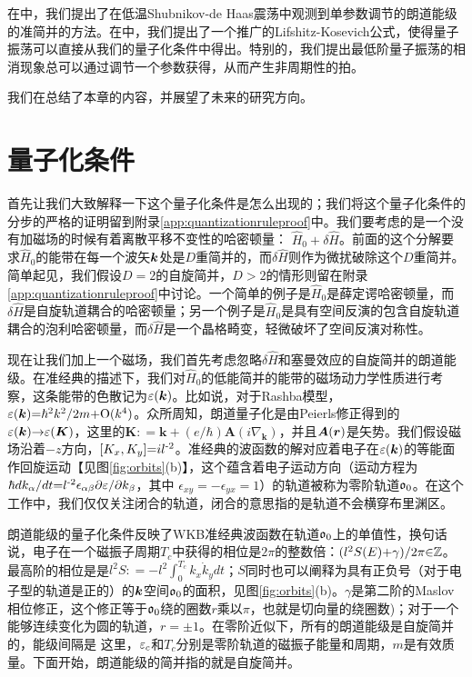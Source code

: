 在中，我们提出了在低温Shubnikov-de Haas震荡\cite{SdH}中观测到单参数调节的朗道能级的准简并的方法。在中，我们提出了一个推广的Lifshitz-Kosevich公式，使得量子振荡可以直接从我们的量子化条件中得出。特别的，我们提出最低阶量子振荡的相消现象总可以通过调节一个参数获得，从而产生非周期性的拍。

我们在总结了本章的内容，并展望了未来的研究方向。


\section{量子化条件\label{sec:qtznrules}}

首先让我们大致解释一下这个量子化条件是怎么出现的；我们将这个量子化条件的分步的严格的证明留到附录\ref{app:quantizationruleproof}中。我们要考虑的是一个没有加磁场的时候有着离散平移不变性的哈密顿量： $\hat{H}_0{+}\delta \hat{H}$。前面的这个分解要求$\hat{H}_0$的能带在每一个波矢$\boldsymbol{k}$处是$D$重简并的，而$\delta \hat{H}$则作为微扰破除这个$D$重简并。简单起见，我们假设$D{=}2$的自旋简并，$D>2$的情形则留在附录\ref{app:quantizationruleproof}中讨论。一个简单的例子是$\hat{H}_0$是薛定谔哈密顿量，而$\delta \hat{H}$是自旋轨道耦合的哈密顿量；另一个例子是$\hat{H}_0$是具有空间反演的包含自旋轨道耦合的泡利哈密顿量，而$\delta \hat{H}$是一个晶格畸变，轻微破坏了空间反演对称性。

现在让我们加上一个磁场，我们首先考虑忽略$\delta \hat{H}$和塞曼效应的自旋简并的朗道能级。在准经典的描述下，我们对$\hat{H}_0$的低能简并的能带的磁场动力学性质进行考察，这条能带的色散记为$\varepsilon(\boldsymbol{k})$。比如说，对于Rashba模型，$\varepsilon(\boldsymbol{k}){=}\hbar^2 k^2/2m{+}\text{O}(k^4)$。众所周知，朗道量子化是由Peierls修正得到的$\varepsilon(\boldsymbol{k}){\rightarrow}\varepsilon(\boldsymbol{K})$\cite{peierls_substitution}，这里的$\boldsymbol{K}{:}{=}\boldsymbol{k}{+}(e/\hbar) \boldsymbol{A}(i\nabla_{\boldsymbol{k}})$，并且$\boldsymbol{A}(\boldsymbol{r})$是矢势。我们假设磁场沿着$-z$方向，$[K_x,K_y]{=}il^{\text{-}2}$。准经典的波函数的解对应着电子在$\varepsilon(\boldsymbol{k})$的等能面作回旋运动【见图\ref{fig:orbits}(b)】，这个蕴含着电子运动方向（运动方程为$ \hbar dk_{\alpha}/dt {=} l^{\text{-}2} \epsilon_{\alpha\beta}\partial \varepsilon/\partial k_{\beta} $，其中 $\epsilon_{xy}{=}{-}\epsilon_{yx}{=}1$）的轨道被称为零阶轨道$\mathfrak{o}_0$。在这个工作中，我们仅仅关注闭合的轨道，闭合的意思指的是轨道不会横穿布里渊区。

朗道能级的量子化条件反映了WKB准经典波函数在轨道$\mathfrak{o}_0$上的单值性\cite{berry_mount_review}，换句话说，电子在一个磁振子周期$T_c$中获得的相位是$2\pi$的整数倍：$(l^2S(E){+}\gamma)/2\pi{\in}\mathbb{Z}$。最高阶的相位是是$l^2S{:}{=}{-}l^2\int_{0}^{T_c} k_x \dot{k}_y dt$；$S$同时也可以阐释为具有正负号（对于电子型的轨道是正的）的$\boldsymbol{k}$空间$\mathfrak{o}_0$的面积，见图\ref{fig:orbits}(b)。$\gamma$是第二阶的Maslov相位修正\cite{keller1958}，这个修正等于$\mathfrak{o}_0$绕的圈数$r$乘以$\pi$，也就是切向量的绕圈数)\cite{100p}；对于一个能够连续变化为圆的轨道，$r{=}{\pm} 1$。在零阶近似下，所有的朗道能级是自旋简并的，能级间隔是
这里，$\varepsilon_c$和$T_c$分别是零阶轨道的磁振子能量和周期，$m$是有效质量。下面开始，朗道能级的简并指的就是自旋简并。



